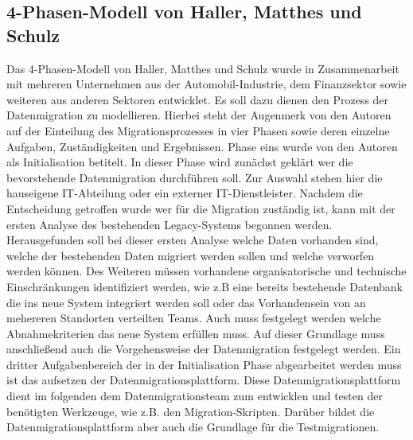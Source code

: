 
\subsection{4-Phasen-Modell von Haller, Matthes und Schulz}


Das 4-Phasen-Modell von Haller, Matthes und Schulz wurde in Zusammenarbeit mit mehreren Unternehmen aus der Automobil-Industrie, dem Finanzsektor sowie weiteren aus anderen Sektoren entwicklet.\citep[S. 2f]{klausMatthesSchulz-2012} Es soll dazu dienen den Prozess der Datenmigration zu modellieren. Hierbei steht der Augenmerk von den Autoren auf der Einteilung des Migrationsprozesses in vier Phasen sowie deren einzelne Aufgaben, Zuständigkeiten und Ergebnissen.\citep[S. 5f]{klausMatthesSchulz-2012}
\lb
Phase eins wurde von den Autoren als Initialisation betitelt. In dieser Phase wird zunächst geklärt wer die bevorstehende Datenmigration durchführen soll. Zur Auswahl stehen hier die hauseigene IT-Abteilung oder ein externer IT-Dienstleister.\citep[S. 7]{klausMatthesSchulz-2012} Nachdem die Entscheidung getroffen wurde wer für die Migration zuständig ist, kann mit der ersten Analyse des bestehenden Legacy-Systems begonnen werden. Herausgefunden soll bei dieser ersten Analyse welche Daten vorhanden sind, welche der bestehenden Daten migriert werden sollen und welche verworfen werden können.\citep[S. 7]{klausMatthesSchulz-2012} Des Weiteren müssen vorhandene organisatorische und technische Einschränkungen identifiziert werden, wie z.B eine bereits bestehende Datenbank die ins neue System integriert werden soll oder das Vorhandensein von an mehereren Standorten verteilten Teams. Auch muss festgelegt werden welche Abnahmekriterien das neue System erfüllen muss.\citep[S. 7]{klausMatthesSchulz-2012} Auf dieser Grundlage muss anschließend auch die Vorgehensweise der Datenmigration festgelegt werden.\citep[S. 7]{klausMatthesSchulz-2012} Ein dritter Aufgabenbereich der in der Initialisation Phase abgearbeitet werden muss ist das aufsetzen der Datenmigrationsplattform. Diese Datenmigrationsplattform dient im folgenden dem Datenmigrationsteam zum entwicklen und testen der benötigten Werkzeuge, wie z.B. den Migration-Skripten. Darüber bildet die Datenmigrationsplattform aber auch die Grundlage für die Testmigrationen.\citep[S.7]{klausMatthesSchulz-2012}
\lb
